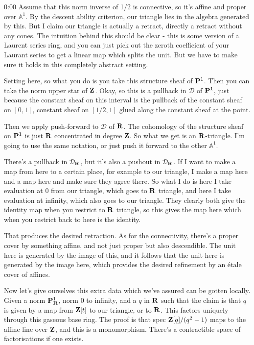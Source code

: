 \begin{unfinished}{0:00}
Assume that this norm inverse of 1/2 is connective, so it's affine and proper over $\mathbb{A}^1$. By the descent ability criterion, our triangle lies in the algebra generated by this. But I claim our triangle is actually a retract, directly a retract without any cones. The intuition behind this should be clear - this is some version of a Laurent series ring, and you can just pick out the zeroth coefficient of your Laurant series to get a linear map which splits the unit. But we have to make sure it holds in this completely abstract setting.

Setting here, so what you do is you take this structure sheaf of $\P^1$. Then you can take the norm upper star of $\Z$. Okay, so this is a pullback in $\mathcal{D}$ of $\P^1$, just because the constant sheaf on this interval is the pullback of the constant sheaf on $[0,1]$, constant sheaf on $[1/2,1]$ glued along the constant sheaf at the point.

Then we apply push-forward to $\mathcal{D}$ of $\R$. The cohomology of the structure sheaf on $\P^1$ is just $\R$ concentrated in degree $\Z$. So what we get is an $\R$-triangle. I'm going to use the same notation, or just push it forward to the other $\mathbb{A}^1$.

There's a pullback in $\mathcal{D}_\R$, but it's also a pushout in $\mathcal{D}_\R$. If I want to make a map from here to a certain place, for example to our triangle, I make a map here and a map here and make sure they agree there. So what I do is here I take evaluation at 0 from our triangle, which goes to $\R$ triangle, and here I take evaluation at infinity, which also goes to our triangle. They clearly both give the identity map when you restrict to $\R$ triangle, so this gives the map here which when you restrict back to here is the identity.

That produces the desired retraction. As for the connectivity, there's a proper cover by something affine, and not just proper but also descendible. The unit here is generated by the image of this, and it follows that the unit here is generated by the image here, which provides the desired refinement by an étale cover of affines.

Now let's give ourselves this extra data which we've assured can be gotten locally. Given a norm $\P^1_\R$, norm 0 to infinity, and a $q$ in $\R$ such that the claim is that $q$ is given by a map from $\Z[t]$ to our triangle, or to $\R$. This factors uniquely through this gaseous base ring. The proof is that spec $\Z[q]/(q^2 - 1)$ maps to the affine line over $\Z$, and this is a monomorphism. There's a contractible space of factorisations if one exists.


\end{unfinished}
